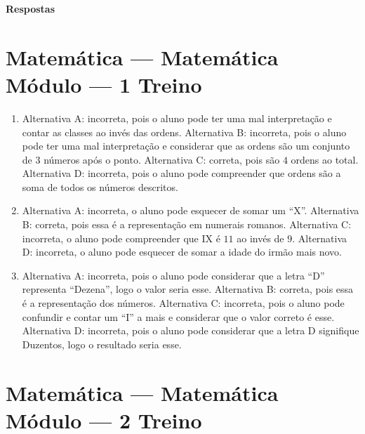 
\pagebreak

{\hfill\Large\bfseries Respostas}

\footnotesize

\pagecolor{gray!40}

\section*{Matemática — Matemática Módulo — 1 Treino}

\begin{enumerate}


\item Alternativa A: incorreta, pois o aluno pode ter uma mal interpretação e
contar as classes ao invés das ordens.
Alternativa B: incorreta, pois o aluno pode ter uma mal interpretação e
considerar que as ordens são um conjunto de $3$ números após o ponto.
Alternativa C: correta, pois são $4$ ordens ao total.
Alternativa D: incorreta, pois o aluno pode compreender que ordens são a
soma de todos os números descritos.

\item Alternativa A: incorreta, o aluno pode esquecer de somar um ``X''.
Alternativa B: correta, pois essa é a representação em numerais romanos.
Alternativa C: incorreta, o aluno pode compreender que IX é $11$ ao invés
de $9$.
Alternativa D: incorreta, o aluno pode esquecer de somar a idade do
irmão mais novo.

\item Alternativa A: incorreta, pois o aluno pode considerar que a letra ``D''
representa ``Dezena'', logo o valor seria esse.
Alternativa B: correta, pois essa é a representação dos números.
Alternativa C: incorreta, pois o aluno pode confundir e contar um ``I''
a mais e considerar que o valor correto é esse.
Alternativa D: incorreta, pois o aluno pode considerar que a letra D
signifique Duzentos, logo o resultado seria esse.
\end{enumerate}

\section*{Matemática — Matemática Módulo — 2 Treino}

